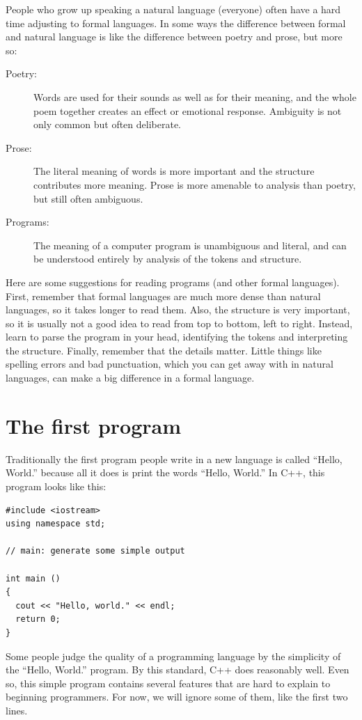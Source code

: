People who grow up speaking a natural language (everyone) often have a
hard time adjusting to formal languages.  In some ways the difference
between formal and natural language is like the difference between
poetry and prose, but more so:


\begin{description}

\item[Poetry:] Words are used for their sounds as well as for
their meaning, and the whole poem together creates an effect or
emotional response.  Ambiguity is not only common but often
deliberate.

\item[Prose:] The literal meaning of words is more important
and the structure contributes more meaning.  Prose is more amenable to
analysis than poetry, but still often ambiguous.

\item[Programs:] The meaning of a computer program is unambiguous
and literal, and can be understood entirely by analysis of the
tokens and structure.

\end{description}

Here are some suggestions for reading programs (and other formal
languages).  First, remember that formal languages are much more dense
than natural languages, so it takes longer to read them.  Also, the
structure is very important, so it is usually not a good idea to read
from top to bottom, left to right.  Instead, learn to parse the
program in your head, identifying the tokens and interpreting the
structure.  Finally, remember that the details matter.  Little things
like spelling errors and bad punctuation, which you can get away
with in natural languages, can make a big difference in a formal
language.

\section{The first program}
\label{hello}

Traditionally the first program people write in a new language
is called ``Hello, World.'' because all it does is print the
words ``Hello, World.''  In C++, this program looks like this:

\begin{lstlisting}
#include <iostream>
using namespace std;

// main: generate some simple output

int main ()
{
  cout << "Hello, world." << endl;
  return 0;
}
\end{lstlisting}
%
Some people judge the quality of a programming language by
the simplicity of the ``Hello, World.'' program.  By this
standard, C++ does reasonably well.  Even so, this simple
program contains several features that are hard to explain to
beginning programmers.  For now, we will ignore some of
them, like the first two lines.

